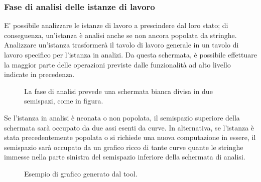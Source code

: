 \subsubsection{Fase di analisi delle istanze di lavoro}

E' possibile analizzare le istanze di lavoro a prescindere dal loro stato; di conseguenza, un'istanza è analisi anche se non ancora popolata da stringhe. Analizzare un'istanza trasformerà il tavolo di lavoro generale in un tavolo di lavoro specifico per l'istanza in analizi. Da questa schermata, è possibile effettuare la maggior parte delle operazioni previste dalle funzionalità ad alto livello indicate in precedenza.

\begin{figure}[ht!]
    \centering
    \caption{La fase di analisi prevede una schermata bianca divisa in due semispazi, come in figura.}
    \label{fig:esempio}
\end{figure}

Se l'istanza in analisi è neonata o non popolata, il semispazio superiore della schermata sarà occupato da due assi esenti da curve. In alternativa, se l'istanza è stata precedentemente popolata o si richiede una nuova computazione in essere, il semispazio sarà occupato da un grafico ricco di tante curve quante le stringhe immesse nella parte sinistra del semispazio inferiore della schermata di analisi.

\begin{figure}[ht!]
    \centering
    \caption{Esempio di grafico generato dal tool.}
    \label{fig:esempio}
\end{figure}

